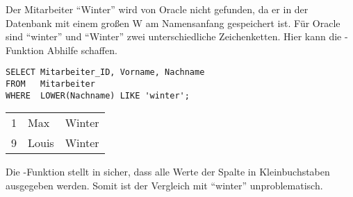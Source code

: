 \begin{center}
    \begin{small}
        \tablehead{}
        \begin{oraclesql}
            \begin{supertabular}{rll}

            \end{supertabular}
        \end{oraclesql}
    \end{small}
\end{center}
Der Mitarbeiter \enquote{Winter} wird von Oracle nicht gefunden, da er in der Datenbank mit einem großen W am Namensanfang gespeichert ist. Für Oracle sind \enquote{winter} und \enquote{Winter} zwei unterschiedliche Zeichenketten. Hier kann die -Funktion Abhilfe schaffen.
\begin{lstlisting}[language=oracle_sql,caption={LOWER - Die Lösung des Problems},label=sql03_03]
SELECT Mitarbeiter_ID, Vorname, Nachname
FROM   Mitarbeiter
WHERE  LOWER(Nachname) LIKE 'winter';
        \end{lstlisting}
\clearpage
\begin{center}
    \begin{small}
        \tablehead{}
        \begin{oraclesql}
            \begin{supertabular}{rll}
                1 & Max & Winter \\
                9 & Louis & Winter \\
            \end{supertabular}
        \end{oraclesql}
    \end{small}
\end{center}
Die -Funktion stellt in  sicher, dass alle Werte der Spalte  in Kleinbuchstaben ausgegeben werden. Somit ist der Vergleich mit \enquote{winter} unproblematisch.
